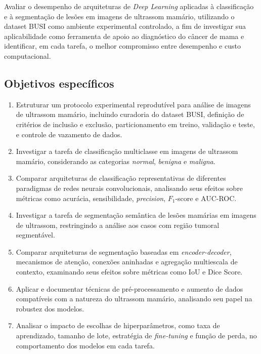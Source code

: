 \documentclass[tcc,capa]{texufpel}
\begin{document}
Avaliar o desempenho de arquiteturas de \textit{Deep Learning} aplicadas à classificação e à segmentação de lesões em imagens de ultrassom mamário, utilizando o dataset BUSI como ambiente experimental controlado, a fim de investigar sua aplicabilidade como ferramenta de apoio ao diagnóstico do câncer de mama e identificar, em cada tarefa, o melhor compromisso entre desempenho e custo computacional.

\subsection{Objetivos específicos}

\begin{enumerate}
	\item Estruturar um protocolo experimental reprodutível para análise de imagens de ultrassom mamário, incluindo curadoria do dataset BUSI, definição de critérios de inclusão e exclusão, particionamento em treino, validação e teste, e controle de vazamento de dados.
	
	\item Investigar a tarefa de classificação multiclasse em imagens de ultrassom mamário, considerando as categorias \textit{normal}, \textit{benigna} e \textit{maligna}.
	
	\item Comparar arquiteturas de classificação representativas de diferentes paradigmas de redes neurais convolucionais, analisando seus efeitos sobre métricas como acurácia, sensibilidade, \textit{precision}, \(F_1\)-score e AUC-ROC.
	
	\item Investigar a tarefa de segmentação semântica de lesões mamárias em imagens de ultrassom, restringindo a análise aos casos com região tumoral segmentável.
	
	\item Comparar arquiteturas de segmentação baseadas em \textit{encoder-decoder}, mecanismos de atenção, conexões aninhadas e agregação multiescala de contexto, examinando seus efeitos sobre métricas como IoU e Dice Score.
	
	\item Aplicar e documentar técnicas de pré-processamento e aumento de dados compatíveis com a natureza do ultrassom mamário, analisando seu papel na robustez dos modelos.
	
	\item Analisar o impacto de escolhas de hiperparâmetros, como taxa de aprendizado, tamanho de lote, estratégia de \textit{fine-tuning} e função de perda, no comportamento dos modelos em cada tarefa.
	

\end{enumerate}
\end{document}
